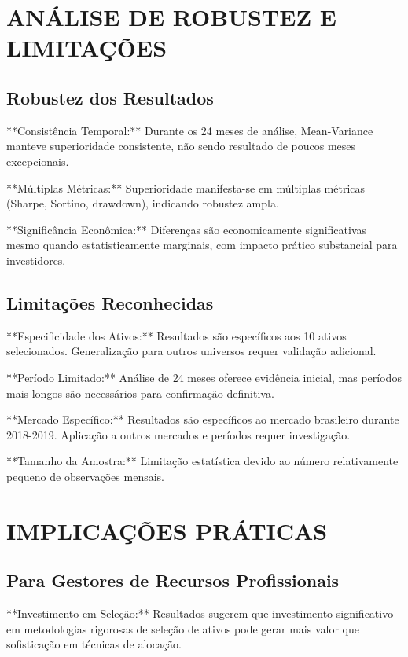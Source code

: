 \section{ANÁLISE DE ROBUSTEZ E LIMITAÇÕES}

\subsection{Robustez dos Resultados}

**Consistência Temporal:** Durante os 24 meses de análise, Mean-Variance manteve superioridade consistente, não sendo resultado de poucos meses excepcionais.

**Múltiplas Métricas:** Superioridade manifesta-se em múltiplas métricas (Sharpe, Sortino, drawdown), indicando robustez ampla.

**Significância Econômica:** Diferenças são economicamente significativas mesmo quando estatisticamente marginais, com impacto prático substancial para investidores.

\subsection{Limitações Reconhecidas}

**Especificidade dos Ativos:** Resultados são específicos aos 10 ativos selecionados. Generalização para outros universos requer validação adicional.

**Período Limitado:** Análise de 24 meses oferece evidência inicial, mas períodos mais longos são necessários para confirmação definitiva.

**Mercado Específico:** Resultados são específicos ao mercado brasileiro durante 2018-2019. Aplicação a outros mercados e períodos requer investigação.

**Tamanho da Amostra:** Limitação estatística devido ao número relativamente pequeno de observações mensais.

\section{IMPLICAÇÕES PRÁTICAS}

\subsection{Para Gestores de Recursos Profissionais}

**Investimento em Seleção:** Resultados sugerem que investimento significativo em metodologias rigorosas de seleção de ativos pode gerar mais valor que sofisticação em técnicas de alocação.

